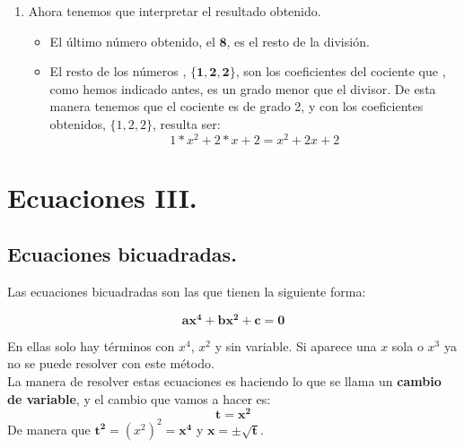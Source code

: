 \documentclass[a4paper,11pt,answers]{exam}
\begin{document}
\begin{enumerate}
  \[
    \begin{NiceArray}{r|rrrr}
      &1&0&-2&4\\
      2&&2&4&\boldsymbol{4}\\
      \hline
      &1&2&2&\boldsymbol{8}
      \CodeAfter
      \begin{tikzpicture}
        \begin{scope}[->]
          \draw ([yshift=-.1\baselineskip]2-1.south) to [bend right = 90]
          ([yshift=-.1\baselineskip]3-4.south);
          \draw (3-4.east) -- ([yshift=-.1\baselineskip]2-5.south);
          
          \draw ([xshift=.1\baselineskip]1-5.east) --
          ([xshift=.1\baselineskip]3-5.east) node[midway, right] {\small{+}};
        \end{scope}
      \end{tikzpicture}
    \end{NiceArray}
  \]
\item Ahora tenemos que interpretar el resultado obtenido.
  \begin{itemize}
  \item El último número obtenido, el $\boldsymbol{8}$, es el resto de la división.
  \item El resto de los números , $\lbrace \boldsymbol{1,2,2}\rbrace$, son los coeficientes del cociente que , como hemos indicado antes, es un grado menor que el divisor. De esta manera tenemos que el cociente es de grado 2, y con los coeficientes obtenidos, $\lbrace 1,2,2\rbrace$, resulta ser:
    \[1*x^2 + 2*x + 2 = x^2 + 2x + 2\]
  \end{itemize}
\end{enumerate}
\section{Ecuaciones III.}
\subsection{Ecuaciones bicuadradas.}
Las ecuaciones bicuadradas son las que tienen la siguiente forma:
\begin{Large}
  \[\boldsymbol{ax^4 + bx^2 + c = 0}\]
\end{Large}
En ellas solo hay términos con $x^4$, $x^2$ y sin variable. Si aparece una $x$ sola o $x^3$ ya no se puede resolver con este método.\\

La manera de resolver estas ecuaciones es haciendo lo que se llama un \textbf{cambio de variable}, y el cambio que vamos a hacer es:
\[\boldsymbol{t = x^2}\]
De manera que $\boldsymbol{t^2} = \left(x^2\right)^2 = \boldsymbol{x^4}$ y
$\boldsymbol{x = \pm \sqrt{t}}$.
\end{document}
